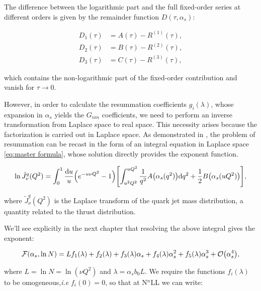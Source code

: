 \documentclass[../Tesi_Jiahao_Miao_986136.tex]{subfiles}
\begin{document}
The difference between the logarithmic part and the full fixed-order series at different orders is given by the remainder function $D(\tau,\alpha_s)$:

\begin{equation} \label{eq:remainder function}
    \begin{split}
        D_1(\tau) &=  A(\tau) - R^{(1)}(\tau),\\
        D_2(\tau) &=  B(\tau) - R^{(2)}(\tau),\\
        D_3(\tau) &=  C(\tau) - R^{(3)}(\tau),
    \end{split}
\end{equation}

which contains the non-logarithmic part of the fixed-order contribution and vanish for $\tau \to 0$.

However, in order to calculate the resummation coefficients $g_i(\lambda)$, whose expansion in $\alpha_s$ yields the $G_{nm}$ coefficients,  we need to perform an inverse transformation from Laplace space to real space.
This necessity arises because the factorization is carried out in Laplace space. As demonstrated in \cite{CATANI19933}, the problem of resummation
can be recast in the form of an integral equation in Laplace space \cref{eq:master formula},  whose solution directly provides the exponent function.

\begin{equation}\label{eq:master formula}
    \ln \tilde{J}_\nu^q(Q^2) = \int_0^1 \frac{\dd u}{u} \qty(e^{-u \nu Q^2}-1)\qty[ \int_{u^2 Q^2}^{u Q^2} \frac{1}{q^2} A\qty(\alpha_s(q^2)) \dd q^2 + \frac{1}{2} B\qty(\alpha_s(u Q^2))],
\end{equation}

where $\tilde{J}_\nu^q(Q^2)$ is the Laplace transform of the quark jet mass distribution, a quantity related to the thrust distribution.

We'll see explicitly in the next chapter that resolving the above integral gives the exponent:

\begin{equation}\label{eq:exponent F}
    \mathcal{F}(\alpha_s,\ln N) = L f_1(\lambda)  + f_2(\lambda) + f_3(\lambda) \alpha_s + f_4(\lambda) \alpha_s^2 + f_5(\lambda) \alpha_s^3 + \order{\alpha_s^4},
\end{equation}

where $L = \ln N = \ln(\nu Q^2)$ and $\lambda = \alpha_s b_0 L$.
We require the functions $f_i(\lambda)$ to be omogeneous,\emph{i.e} $f_i(0)=0$, so that at N$^n$LL we can write:
\end{document}
